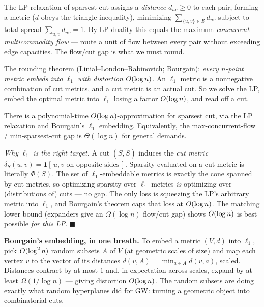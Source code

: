 \begin{intuitionbox}
The LP relaxation of sparsest cut assigns a \emph{distance} $d_{uv}\ge 0$ to each pair, forming a
metric ($d$ obeys the triangle inequality), minimizing $\sum_{\{u,v\}\in E} d_{uv}$ subject to total
spread $\sum_{u,v} d_{uv}=1$. By LP duality this equals the maximum \emph{concurrent multicommodity
flow} --- route a unit of flow between every pair without exceeding edge capacities. The flow/cut gap
is what we must round.

The rounding theorem (Linial--London--Rabinovich; Bourgain): \emph{every $n$-point metric embeds into
$\ell_1$ with distortion $O(\log n)$}. An $\ell_1$ metric is a nonnegative combination of cut
metrics, and a cut metric is an actual cut. So we solve the LP, embed the optimal metric into
$\ell_1$ losing a factor $O(\log n)$, and read off a cut.
\end{intuitionbox}

\begin{theorem}\label{ch38:thm-lr}
There is a polynomial-time $O(\log n)$-approximation for sparsest cut, via the LP relaxation and
Bourgain's $\ell_1$ embedding. Equivalently, the max-concurrent-flow / min-sparsest-cut gap is
$\Theta(\log n)$ for general demands.
\end{theorem}

\begin{whybox}
\emph{Why $\ell_1$ is the right target.} A cut $(S,\bar S)$ induces the \emph{cut metric}
$\delta_S(u,v)=\mathbf{1}[\,\text{$u,v$ on opposite sides}\,]$. Sparsity evaluated on a cut metric is
literally $\Phi(S)$. The set of $\ell_1$-embeddable metrics is exactly the cone spanned by cut
metrics, so optimizing sparsity over $\ell_1$ metrics \emph{is} optimizing over (distributions of)
cuts --- no gap. The only loss is squeezing the LP's arbitrary metric into $\ell_1$, and Bourgain's
theorem caps that loss at $O(\log n)$. The matching lower bound (expanders give an
$\Omega(\log n)$ flow/cut gap) shows $O(\log n)$ is best possible \emph{for this LP}. $\blacksquare$
\end{whybox}

\begin{focusbox}
\textbf{Bourgain's embedding, in one breath.} To embed a metric $(V,d)$ into $\ell_1$, pick
$O(\log^2 n)$ random subsets $A$ of $V$ (at geometric scales of size) and map each vertex $v$ to the
vector of its distances $d(v,A)=\min_{a\in A}d(v,a)$, scaled. Distances contract by at most $1$ and,
in expectation across scales, expand by at least $\Omega(1/\log n)$ --- giving distortion
$O(\log n)$. The random subsets are doing exactly what random hyperplanes did for GW: turning a
geometric object into combinatorial cuts.
\end{focusbox}

